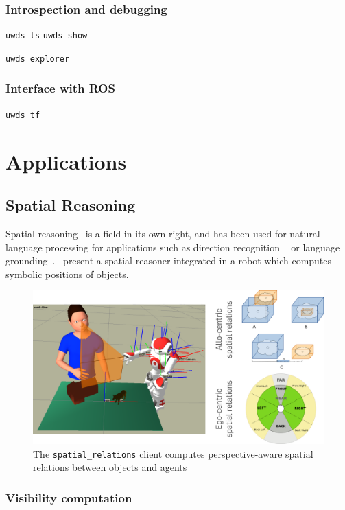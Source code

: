 \documentclass[letterpaper, 10 pt, conference]{ieeeconf}  %
\begin{document}
\subsubsection{Introspection and debugging}

{\tt uwds ls}
{\tt uwds show}

{\tt uwds explorer}


\subsubsection{Interface with ROS}

{\tt uwds tf}

\section{Applications}

\subsection{Spatial Reasoning}

Spatial reasoning~\cite{O'Keefe1999} is a field in its own right, and has been
used for natural language processing for applications such as direction
recognition ~\cite{Kollar2010,Matuszek2010} or language
grounding~\cite{Tellex2010}.~\cite{Skubic2004} present a spatial reasoner
integrated in a robot which computes symbolic positions of objects.

\begin{figure}
    \centering
    \includegraphics[width=0.9\linewidth]{spatialrelations}
    \caption{The {\tt spatial\_relations} client computes perspective-aware
    spatial relations between objects and agents}
    \label{fig|spatialrelations}
\end{figure}

\cite{Ros2010}

\subsubsection{Visibility computation}
\end{document}
